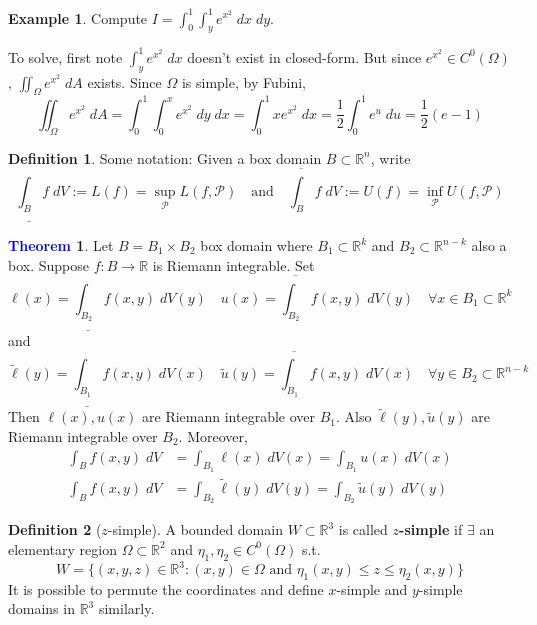 \documentclass[11pt]{article}
\theoremstyle{definition}
\newtheorem{exmp}{Example}[section]
\theoremstyle{definition}
\newcommand{\R}[0]{\mathbb{R}}
\newtheorem{theorem}{\textcolor{blue}{Theorem}}
\theoremstyle{definition}
\newtheorem{definition}{\textcolor{OliveGreen}{Definition}}
\theoremstyle{remark}
\begin{document}
\begin{exmp}
    Compute $I = \int_0^1 \int_y^1 e^{x^2} \; dx \; dy$.

    To solve, first note $\int_y^1 e^{x^2} \; dx$ doesn't exist in closed-form. But since $e^{x^2} \in C^0(\Omega)$, $\iint_{\Omega} e^{x^2} \; dA$ exists.
    Since $\Omega$ is simple, by Fubini,
    \[
        \iint_{\Omega} e^{x^2} \; dA = \int_0^1 \int_0^x e^{x^2} \; dy \; dx = \int_0^1 x e^{x^2} \; dx = \frac{1}{2} \int_0^1 e^u \; du = \frac{1}{2}(e - 1)
    \]   
\end{exmp}

\begin{definition}
    Some notation: Given a box domain $B \subset \R^n$, write
    \[
        \underline{\int_{B}} f \; dV := L(f) = \sup_{\mathcal{P}} L(f, \mathcal{P}) \quad \text{and} \quad \overline{\int_{B}} f \; dV := U(f) = \inf_{\mathcal{P}} U(f, \mathcal{P})
    \]  
\end{definition}

\begin{theorem}
    Let $B = B_1 \times B_2$ box domain where $B_1 \subset \R^k$ and $B_2 \subset \R^{n - k}$ also a box.
    Suppose $f : B \to \R$ is Riemann integrable. Set
    \[
        \ell(x) = \underline{\int_{B_2}} f(x,y) \; dV(y) \quad u(x) = \overline{\int_{B_2}} f(x,y) \; dV(y) \quad \forall x \in B_1 \subset \R^k
    \]      
    and 
    \[
        \tilde{\ell}(y) = \underline{\int_{B_1}} f(x,y) \; dV(x) \quad \tilde{u}(y) = \overline{\int_{B_1}} f(x,y) \; dV(x) \quad \forall y \in B_2 \subset \R^{n-k}
    \] 
    Then $\ell(x), u(x)$ are Riemann integrable over $B_1$. Also $\tilde{\ell}(y), \tilde{u}(y)$ are Riemann integrable over $B_2$.
    Moreover,
    \begin{align*}
        \int_B f(x,y) \; dV &= \int_{B_1} \ell(x) \; dV(x) = \int_{B_1} u(x) \; dV(x) \\
        \int_B f(x,y) \; dV &= \int_{B_2} \tilde{\ell}(y) \; dV(y) = \int_{B_2} \tilde{u}(y) \; dV(y)
    \end{align*}
\end{theorem}

\begin{definition}[$z$-simple]
    A bounded domain $W \subset \R^3$ is called \textbf{$z$-simple} if $\exists $ an elementary region $\Omega \subset \R^2$
    and $\eta_1, \eta_2 \in C^0(\Omega)$ s.t.
    \[
        W = \{ (x,y,z) \in \R^3 : (x,y) \in \Omega  \text{ and } \eta_1(x,y) \leq z \leq \eta_2(x,y) \}
    \]       
    It is possible to permute the coordinates and define $x$-simple and $y$-simple domains in $\R^3$ similarly.
\end{definition}
\end{document}
